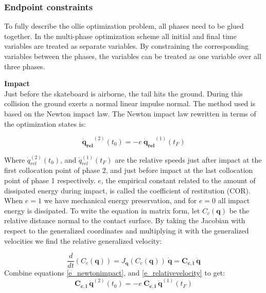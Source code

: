 \documentclass[default,iicol]{sn-jnl}
\theoremstyle{thmstyleone}%
\theoremstyle{thmstyletwo}%
\theoremstyle{thmstylethree}%
\begin{document}
\subsubsection{Endpoint constraints} \label{p_endpoints}
To fully describe the ollie optimization problem, all phases need to be glued together. In the multi-phase optimization scheme all initial and final time variables are treated as separate variables. By constraining the corresponding variables between the phases, the variables can be treated as one variable over all three phases.

\textbf{Impact}\\
Just before the skateboard is airborne, the tail hits the ground. During this collision the ground exerts a normal linear impulse normal. The method used\cite{vallery_heike_advanced_2018} is based on the Newton impact law. The Newton impact law rewritten in terms of the optimization states is:

\begin{equation}\label{e_newtonimpact}
    \mathbf{\dot q_{rel}}^{(2)}(t_0) = -e\ \mathbf{\dot q_{rel}}^{(1)}(t_F)
\end{equation}

Where $\dot q_{rel}^{(2)}(t_0)$, and $\dot q_{rel}^{(1)}(t_F)$ are the relative speeds just after impact at the first collocation point of phase 2, and just before impact at the last collocation point of phase 1 respectively.  $e$, the empirical constant related to the amount of dissipated energy during impact, is called the coefficient of restitution (COR). When $e=1$ we have mechanical energy preservation, and for $e=0$ all impact energy is dissipated. To write the equation in matrix form, let $C_c(\mathbf{q})$ be the relative distance normal to the contact surface. By taking the Jacobian with respect to the generalized coordinates and multiplying it with the generalized velocities we find the relative generalized velocity:

\begin{equation}\label{e_relativevelocity}
    \frac{d}{dt}\left(C_c(\mathbf{q})\right) = J_{\mathbf{q}}(C_c(\mathbf{q}))\ \mathbf{\dot q} = \mathbf{C_{c,i}}\  \mathbf{\dot q}
\end{equation}
Combine equations \ref{e_newtonimpact}, and \ref{e_relativevelocity} to get:
\begin{equation}
    \mathbf{C_{c,i}}\  \mathbf{\dot q}^{(2)}(t_0) = -e\ \mathbf{C_{c,i}}\ \mathbf{\dot q}^{(1)}(t_F)
\end{equation}
\end{document}
